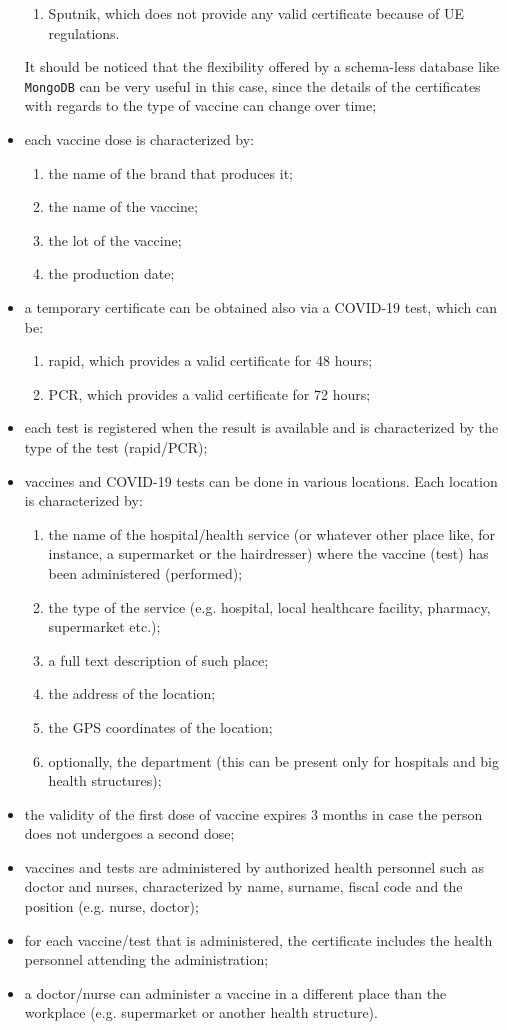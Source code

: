 \documentclass{article}
\begin{document}
\begin{itemize}
\begin{enumerate}
   \item Sputnik, which does not provide any valid certificate because of UE regulations.
\end{enumerate}
It should be noticed that the flexibility offered by a schema-less database like \verb|MongoDB| can be very useful in this case, since the details of the certificates with regards to the type of vaccine can change over time;
\item each vaccine dose is characterized by:
\begin{enumerate}
    \item the name of the brand that produces it;
    \item the name of the vaccine;
    \item the lot of the vaccine;
    \item the production date;
\end{enumerate}
\item a temporary certificate can be obtained also via a COVID-19 test, which can be:
\begin{enumerate}
    \item rapid, which provides a valid certificate for 48 hours;
    \item PCR, which provides a valid certificate for 72 hours;
    \end{enumerate}
\item each test is registered when the result is available and is characterized by the type of the test (rapid/PCR);
\item vaccines and COVID-19 tests can be done in various locations. Each location is characterized by:
\begin{enumerate}
    \item the name of the hospital/health service (or whatever other place like, for instance, a supermarket or the hairdresser) where the vaccine (test) has been administered (performed);
    \item the type of the service (e.g. hospital, local healthcare facility, pharmacy, supermarket etc.);
    \item a full text description of such place;
    \item the address of the location;
    \item the GPS coordinates of the location;
    \item optionally, the department (this can be present only for hospitals and big health structures);
\end{enumerate}
\item the validity of the first dose of vaccine expires 3 months in case the person does not undergoes a second dose;
\item vaccines and tests are administered by authorized health personnel such as doctor and nurses, characterized by name, surname, fiscal code and the position (e.g. nurse, doctor);
\item for each vaccine/test that is administered, the certificate includes the health personnel attending the administration;
\item a doctor/nurse can administer a vaccine in a different place than the workplace (e.g. supermarket or another health structure).
\end{itemize}
\newpage
\end{document}
